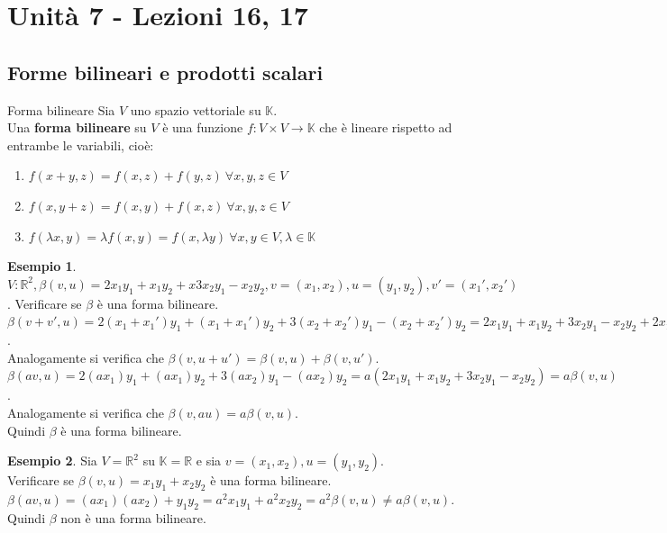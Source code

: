 \documentclass[a4paper]{article}
\theoremstyle{definition}
\newtheorem*{es}{Esempio}
\begin{document}
	\section{Unità 7  - Lezioni 16, 17}
	\subsection{Forme bilineari e prodotti scalari}
	\begin{deff}{Forma bilineare}{}
		Sia $V$ uno spazio vettoriale su $\mathbb{K}$. \\
		Una \textbf{forma bilineare} su $V$ è una funzione $f: V \times V \to \mathbb{K}$ che è lineare rispetto ad entrambe le variabili, cioè:
		\begin{enumerate}
			\item $f(x + y, z) = f(x, z) + f(y, z) \ \forall x, y, z \in V$
			\item $f(x, y + z) = f(x, y) + f(x, z) \ \forall x, y, z \in V$
			\item $f(\lambda x, y) = \lambda f(x, y) = f(x, \lambda y) \ \forall x, y \in V, \lambda \in \mathbb{K}$
		\end{enumerate}
	\end{deff}

	\begin{es}
		$V: \mathbb{R}^2, \beta(v, u) = 2x_1y_1 + x_1y_2 + x 3x_2y_1 - x_2y_2, v = (x_1, x_2), u = (y_1, y_2), v' = (x_1', x_2')$.
		Verificare se $\beta$ è una forma bilineare. \\
		$\beta(v + v', u) = 2(x_1 + x_1')y_1 + (x_1 + x_1')y_2 + 3(x_2 + x_2')y_1 - (x_2 + x_2')y_2 = 2x_1y_1 + x_1y_2 + 3x_2y_1 - x_2y_2 + 2x_1'y_1 + x_1'y_2 + 3x_2'y_1 - x_2'y_2 = \beta(v, u) + \beta(v', u)$. \\
		Analogamente si verifica che $\beta(v, u + u') = \beta(v, u) + \beta(v, u')$. \\
		$\beta(av, u) = 2(ax_1)y_1 + (ax_1)y_2 + 3(ax_2)y_1 - (ax_2)y_2 = a(2x_1y_1 + x_1y_2 + 3x_2y_1 - x_2y_2) = a\beta(v, u)$. \\
		Analogamente si verifica che $\beta(v, au) = a\beta(v, u)$. \\
		Quindi $\beta$ è una forma bilineare.
	\end{es}

	\begin{es}
		Sia $V = \mathbb{R}^2$ su $\mathbb{K} = \mathbb{R}$ e sia $v = (x_1, x_2), u = (y_1, y_2)$. \\
		Verificare se $\beta(v, u) = x_1y_1 + x_2y_2$ è una forma bilineare. \\
		$\beta(av, u) = (ax_1)(ax_2) + y_1y_2 = a^2x_1y_1 + a^2x_2y_2 = a^2\beta(v, u) \ne a\beta(v, u)$. \\
		Quindi $\beta$ non è una forma bilineare.
	\end{es}
\end{document}
